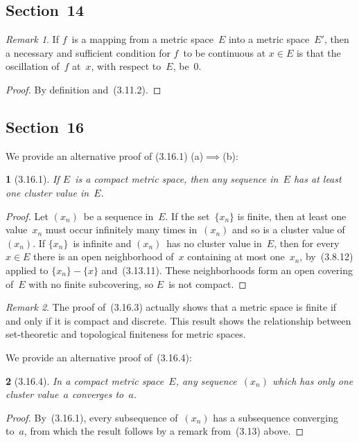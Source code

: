 \documentclass[letterpaper,12pt]{article}
\theoremstyle{plain}
\newtheorem*{prop}{}
\theoremstyle{definition}
\theoremstyle{remark}
\newtheorem*{rmk}{Remark}
\begin{document}
\subsection*{Section~14}
\begin{rmk}
If \(f\)~is a mapping from a metric space~\(E\) into a metric space~\(E'\), then a necessary and sufficient condition for \(f\)~to be continuous at \(x\in E\) is that the oscillation of~\(f\) at~\(x\), with respect to~\(E\), be~\(0\).
\end{rmk}
\begin{proof}
By definition and~(3.11.2).
\end{proof}

\subsection*{Section~16}
We provide an alternative proof of (3.16.1) (a)\(\implies\)(b):
\begin{prop}[3.16.1]
If \(E\)~is a compact metric space, then any sequence in~\(E\) has at least one cluster value in~\(E\).
\end{prop}
\begin{proof}
Let \((x_n)\)~be a sequence in~\(E\). If the set~\(\{x_n\}\) is finite, then at least one value~\(x_n\) must occur infinitely many times in~\((x_n)\) and so is a cluster value of~\((x_n)\). If \(\{x_n\}\)~is infinite and \((x_n)\)~has no cluster value in~\(E\), then for every \(x\in E\) there is an open neighborhood of~\(x\) containing at most one~\(x_n\),  by~(3.8.12) applied to \(\{x_n\}-\{x\}\) and~(3.13.11). These neighborhoods form an open covering of~\(E\) with no finite subcovering, so \(E\)~is not compact.
\end{proof}

\begin{rmk}
The proof of~(3.16.3) actually shows that a metric space is finite if and only if it is compact and discrete. This result shows the relationship between set-theoretic and topological finiteness for metric spaces.
\end{rmk}

\noindent We provide an alternative proof of~(3.16.4):
\begin{prop}[3.16.4]
In a compact metric space~\(E\), any sequence~\((x_n)\) which has only one cluster value~\(a\) converges to~\(a\).
\end{prop}
\begin{proof}
By~(3.16.1), every subsequence of~\((x_n)\) has a subsequence converging to~\(a\), from which the result follows by a remark from~(3.13) above.
\end{proof}
\end{document}
